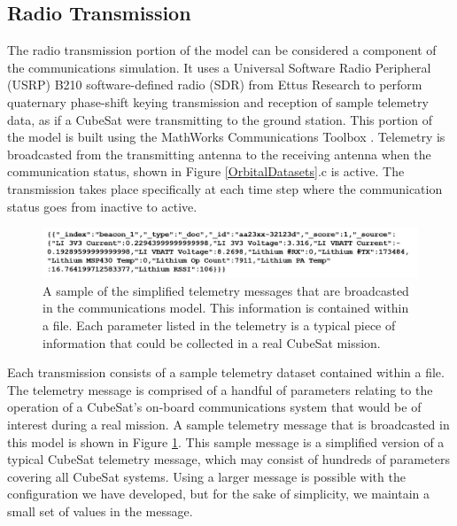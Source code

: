 \documentclass[conf]{new-aiaa}
\begin{document}
\subsection{Radio Transmission}
\label{ref:radio}

The radio transmission portion of the model can be considered a component of the communications simulation. It uses a Universal Software Radio Peripheral (USRP) B210 software-defined radio (SDR) from Ettus Research to perform quaternary phase-shift keying transmission and reception of sample telemetry data, as if a CubeSat were transmitting to the ground station. This portion of the model is built using the MathWorks Communications Toolbox \cite{CommunicationsToolbox}. Telemetry is broadcasted from the transmitting antenna to the receiving antenna when the communication status, shown in Figure \ref{OrbitalDatasets}.c is active. The transmission takes place specifically at each time step where the communication status goes from inactive to active.

\begin{figure}[!ht]
\centering
\includegraphics[width=1\textwidth]{Fig/SampleTelemetry.png}
\caption{A sample of the simplified telemetry messages that are broadcasted in the communications model. This information is contained within a file. Each parameter listed in the telemetry is a typical piece of information that could be collected in a real CubeSat mission.}
\label{SampleTelemetry}
\end{figure}

Each transmission consists of a sample telemetry dataset contained within a file. The telemetry message is comprised of a handful of parameters relating to the operation of a CubeSat's on-board communications system that would be of interest during a real mission. A sample telemetry message that is broadcasted in this model is shown in Figure \ref{SampleTelemetry}. This sample message is a simplified version of a typical CubeSat telemetry message, which may consist of hundreds of parameters covering all CubeSat systems. Using a larger message is possible with the configuration we have developed, but for the sake of simplicity, we maintain a small set of values in the message.
\end{document}
